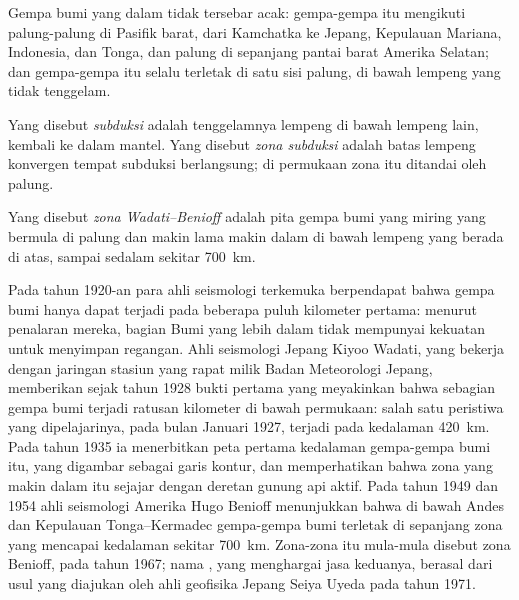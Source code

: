 Gempa bumi yang dalam tidak tersebar acak: gempa-gempa itu mengikuti palung-palung
di Pasifik barat, dari Kamchatka ke Jepang, Kepulauan Mariana, Indonesia, dan
Tonga, dan palung di sepanjang pantai barat Amerika Selatan; dan gempa-gempa itu
selalu terletak di satu sisi palung, di bawah lempeng yang tidak tenggelam.

\begin{definition}\label{def:g11:subduction-zones:subduction}
Yang disebut \emph{subduksi} adalah tenggelamnya lempeng
 di bawah lempeng lain, kembali ke dalam mantel. Yang disebut
\emph{zona subduksi} adalah batas lempeng konvergen tempat
subduksi berlangsung; di permukaan zona itu ditandai oleh palung.
\end{definition}

\begin{definition}\label{def:g11:subduction-zones:benioff}
Yang disebut \emph{zona Wadati--Benioff} adalah pita
gempa bumi yang miring yang bermula di palung dan makin lama makin dalam di
bawah lempeng yang berada di atas, sampai sedalam sekitar \qty{700}{km}.
\end{definition}

\begin{history}
Pada tahun 1920-an para ahli seismologi terkemuka berpendapat bahwa gempa bumi
hanya dapat terjadi pada beberapa puluh kilometer pertama: menurut penalaran
mereka, bagian Bumi yang lebih dalam tidak mempunyai kekuatan untuk menyimpan
regangan. Ahli seismologi Jepang Kiyoo Wadati, yang bekerja dengan jaringan
stasiun yang rapat milik Badan Meteorologi Jepang, memberikan sejak tahun 1928
bukti pertama yang meyakinkan bahwa sebagian gempa bumi terjadi ratusan kilometer
di bawah permukaan: salah satu peristiwa yang dipelajarinya, pada bulan Januari
1927, terjadi pada kedalaman \qty{420}{km}. Pada tahun 1935 ia menerbitkan peta
pertama kedalaman gempa-gempa bumi itu, yang digambar sebagai garis kontur, dan
memperhatikan bahwa zona yang makin dalam itu sejajar dengan deretan gunung api
aktif. Pada tahun 1949 dan 1954 ahli seismologi Amerika Hugo Benioff menunjukkan
bahwa di bawah Andes dan Kepulauan Tonga--Kermadec gempa-gempa bumi terletak di
sepanjang zona yang mencapai kedalaman sekitar \qty{700}{km}. Zona-zona itu
mula-mula disebut zona Benioff, pada tahun 1967; nama , yang
menghargai jasa keduanya, berasal dari usul yang diajukan oleh ahli geofisika
Jepang Seiya Uyeda pada tahun 1971.
\end{history}

